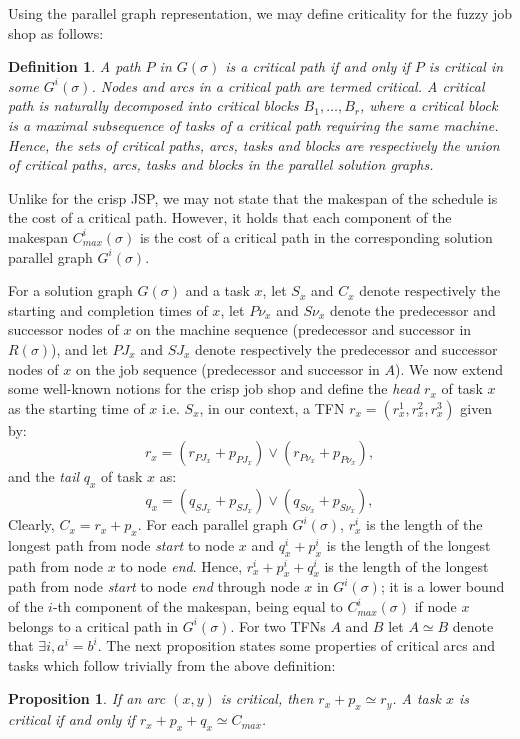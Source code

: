\documentclass[letterpaper]{article}
\newtheorem{definition}{Definition}
\newtheorem{proposition}{Proposition}
\begin{document}
Using the parallel graph representation, we may define criticality for the fuzzy job shop as follows:
\begin{definition}\label{defCritical2}
A path $P$ in $G(\sigma)$ is a \emph{critical path} if and only if $P$ is critical in some $G^i(\sigma)$. Nodes and arcs in a critical path are termed \emph{critical}. A critical path is naturally decomposed into critical blocks $B_1,\dots,B_r$, where a \emph{critical block} is a maximal subsequence of tasks of a critical path requiring the same machine. Hence, the sets of critical paths, arcs, tasks and blocks %
are respectively the union of critical paths, arcs, tasks and blocks in the parallel solution graphs.
\end{definition}
Unlike for the crisp JSP, we may not state that the makespan of the schedule is the cost of a critical path. However, it holds that each component of the makespan $C_{max}^i(\sigma)$ is the cost of a critical path in the corresponding solution parallel graph $G^i(\sigma)$.

For a solution graph $G(\sigma)$ and a task $x$, let $S_x$ and $C_x$ denote respectively the starting and completion times of $x$, let $P\nu_x$ and $S\nu_x$ denote the predecessor and successor nodes of $x$ on the machine sequence (predecessor and successor in $R(\sigma)$), and let $PJ_x$ and $SJ_x$ denote respectively the predecessor and successor nodes of $x$ on the job sequence (predecessor and successor in $A$). We now extend some well-known notions for the crisp job shop and define the \emph{head} $r_x$ of task $x$ as the starting time of $x$ i.e. $S_x$, in our context, a TFN $r_x=(r_x^1, r_x^2, r_x^3)$ given by:
\begin{equation}\label{eqHeadrx}
r_x = (r_{PJ_x} + p_{PJ_x}) \vee (r_{P\nu_x} + p_{P\nu_x}),
\end{equation}
and the \emph{tail} $q_x$ of task $x$ as:
\begin{equation}\label{eqTailqx}
q_x = (q_{SJ_x} + p_{SJ_x}) \vee (q_{S\nu_x} + p_{S\nu_x}),
\end{equation}
Clearly, $C_x = r_x + p_x$. For each parallel graph $G^i(\sigma)$, $r_x^i$ is the length of the longest path from node \emph{start} to node $x$ and $q_x^i+p_x^i$ is the length of the longest path from node $x$ to node \emph{end}. Hence, $r_x^i+p_x^i+q_x^i$ is the length of the longest path from node \emph{start} to node \emph{end} through node $x$ in $G^i(\sigma)$; it is a lower bound of the $i$-th component of the makespan, being equal to $C_{max}^i(\sigma)$ if node $x$ belongs to a critical path in $G^i(\sigma)$. For two TFNs $A$ and $B$ let $A \simeq  B$ denote that $\exists i, a^i = b^i$. The next proposition states some properties of critical arcs and tasks which follow trivially from the above definition:
\begin{proposition}\label{propPropertiesCriticalArcs}
If an arc $(x,y)$ is critical, then $r_x + p_x \simeq r_y$. A task $x$ is critical if and only if $r_x + p_x + q_x \simeq C_{max}$.
\end{proposition}
\end{document}
